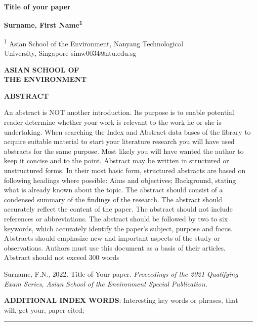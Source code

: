 \documentclass[a4paper,10pt]{article}
\begin{document}
 	\noindent\begin{minipage}[h]{1\textwidth}
 	
 	\Large
    \textbf{Title of your paper}
        
    \vspace{0.8cm}
 	\end{minipage}
 	\begin{minipage}[b]{0.5\textwidth}
    \textbf{Surname, First Name\textsuperscript{1}}\par
        \vspace{0.4cm}
    \small
    \textsuperscript{1} Asian School of the Environment, Nanyang Technological\\University, Singapore simw0034@ntu.edu.sg\par

 \end{minipage} 
   \hfill
\begin{minipage}[b]{0.4\textwidth}
 	\noindent\Large
    \centering\textbf{ASIAN SCHOOL OF\\THE ENVIRONMENT}
\end{minipage} 

\vspace{1.2cm}

\hspace{1cm}
\hfill
\begin{minipage}[h]{0.92\textwidth}
\textbf{ABSTRACT}

An abstract is NOT another introduction. Its purpose is to enable potential reader determine whether your work is relevant to the work he or she is undertaking. When searching the Index and Abstract data bases of the library to acquire suitable material to start your literature research you will have used abstracts for the same purpose. Most likely you will have wanted the author to keep it concise and to the point. Abstract may be written in structured or unstructured forms. In their most basic form, structured abstracts are based on following headings where possible: Aims and objectives; Background, stating what is already known about the topic. The abstract should consist of a condensed summary of the findings of the research. The abstract should accurately reflect the content of the paper. The abstract should not include references or abbreviations. The abstract should be followed by two to six keywords, which accurately identify the paper’s subject, purpose and focus. Abstracts should emphasize new and important aspects of the study or observations. Authors must use this document as a basis of their articles. Abstract should not exceed 300 words 
 
     \vspace{0.4cm}
\noindent
Surname, F.N., 2022. Title of Your paper. \textit{Proceedings of the 2021 Qualifying Exam Series, Asian School of the Environment Special Publication.}

    \vspace{0.4cm}
\noindent\textbf{ADDITIONAL INDEX WORDS}:  Interesting key words or phrases, that will, get your, paper cited; 

\rule{1\textwidth}{0.5pt}
\end{minipage}
\end{document}
